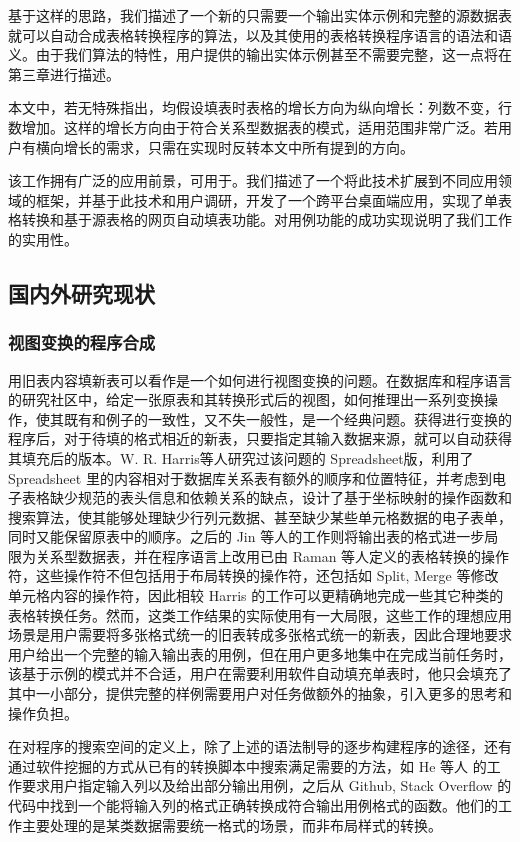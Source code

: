 \documentclass[design, pageheader]{njubachelor}
\begin{document}
基于这样的思路，我们描述了一个新的只需要一个输出实体示例和完整的源数据表就可以自动合成表格转换程序的算法，以及其使用的表格转换程序语言的语法和语义。由于我们算法的特性，用户提供的输出实体示例甚至不需要完整，这一点将在第三章进行描述。

本文中，若无特殊指出，均假设填表时表格的增长方向为纵向增长：列数不变，行数增加。这样的增长方向由于符合关系型数据表的模式，适用范围非常广泛。若用户有横向增长的需求，只需在实现时反转本文中所有提到的方向。

该工作拥有广泛的应用前景，可用于。我们描述了一个将此技术扩展到不同应用领域的框架，并基于此技术和用户调研，开发了一个跨平台桌面端应用，实现了单表格转换和基于源表格的网页自动填表功能。对用例功能的成功实现说明了我们工作的实用性。

\subsection{国内外研究现状}
\subsubsection{视图变换的程序合成}
用旧表内容填新表可以看作是一个如何进行视图变换的问题。在数据库和程序语言的研究社区中，给定一张原表和其转换形式后的视图，如何推理出一系列变换操作，使其既有和例子的一致性，又不失一般性，是一个经典问题\cite{sarma10}。获得进行变换的程序后，对于待填的格式相近的新表，只要指定其输入数据来源，就可以自动获得其填充后的版本。W. R. Harris等人研究过该问题的 Spreadsheet版\cite{harris11}，利用了 Spreadsheet 里的内容相对于数据库关系表有额外的顺序和位置特征，并考虑到电子表格缺少规范的表头信息和依赖关系的缺点，设计了基于坐标映射的操作函数和搜索算法，使其能够处理缺少行列元数据、甚至缺少某些单元格数据的电子表单，同时又能保留原表中的顺序。之后的 Jin 等人的工作则将输出表的格式进一步局限为关系型数据表\cite{jin17}，并在程序语言上改用已由 Raman 等人\cite{raman01}定义的表格转换的操作符，这些操作符不但包括用于布局转换的操作符，还包括如 Split, Merge 等修改单元格内容的操作符，因此相较 Harris 的工作可以更精确地完成一些其它种类的表格转换任务。然而，这类工作结果的实际使用有一大局限，这些工作的理想应用场景是用户需要将多张格式统一的旧表转成多张格式统一的新表，因此合理地要求用户给出一个完整的输入输出表的用例，但在用户更多地集中在完成当前任务时，该基于示例的模式并不合适，用户在需要利用软件自动填充单表时，他只会填充了其中一小部分，提供完整的样例需要用户对任务做额外的抽象，引入更多的思考和操作负担。

在对程序的搜索空间的定义上，除了上述的语法制导的逐步构建程序的途径，还有通过软件挖掘的方式从已有的转换脚本中搜索满足需要的方法，如 He 等人\cite{he18} 的工作要求用户指定输入列以及给出部分输出用例，之后从 Github, Stack Overflow 的代码中找到一个能将输入列的格式正确转换成符合输出用例格式的函数。他们的工作主要处理的是某类数据需要统一格式的场景，而非布局样式的转换。
\end{document}
